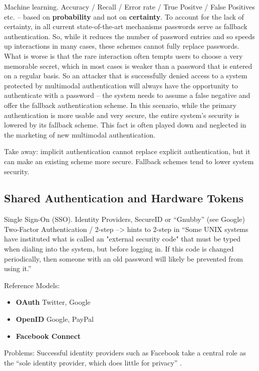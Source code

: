 	Machine learning. Accuracy / Recall / Error rate / True Positve / False Positives etc. -- based on \textbf{probability} and not on \textbf{certainty}. To account for the lack of certainty, in all current state-of-the-art mechanisms passwords serve as fallback authentication. So, while it reduces the number of password entries and so speeds up interactions in many cases, these schemes cannot fully replace passwords. What is worse is that the rare interaction often tempts users to choose a very memorable secret, which in most cases is weaker than a password that is entered on a regular basis. So an attacker that is successfully denied access to a system protected by multimodal authentication will always have the opportunity to authenticate with a password -- the system needs to assume a false negative and offer the fallback authentication scheme. In this scenario, while the primary authentication is more usable and very secure, the entire system's security is lowered by its fallback scheme. This fact is often played down and neglected in the marketing of new multimodal authentication. 
	
	Take away: implicit authentication cannot replace explicit authentication, but it can make an existing scheme more secure. Fallback schemes tend to lower system security. 
	

	
	\subsection{Shared Authentication and Hardware Tokens}
Single Sign-On (SSO). 
Identity Providers, 
SecureID or ``Gnubby'' (see Google)
Two-Factor Authentication / 2-step --> hints to 2-step in ``Some UNIX systems have instituted what is called an "external security code" that must be typed when dialing into the system, but before logging in. If this code is changed periodically, then someone with an old password will likely be prevented from using it.'' \cite{Morris1979PasswordSecurity}

Reference Models:

\cite{Egelman2013ProfilePassword,Sun2010BillionKeys}

\begin{itemize}
\item \textbf{OAuth} Twitter, Google
\item \textbf{OpenID} Google, PayPal
\item \textbf{Facebook Connect} 
\end{itemize}
Problems: 
Successful identity providers such as Facebook take a central role as the ``sole identity provider, which does little for privacy'' \cite{Bonneau2015ImperfectAuthentication}.


